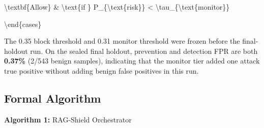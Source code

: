 \documentclass[conference]{IEEEtran}
\begin{document}
\textbackslash{}textbf\{Allow\} \& \textbackslash{}text\{if \} P\_\{\textbackslash{}text\{risk\}\} < \textbackslash{}tau\_\{\textbackslash{}text\{monitor\}\}

\textbackslash{}end\{cases\}$$


The 0.35 block threshold and 0.31 monitor threshold were frozen before the final-holdout run. On the sealed final holdout, prevention and detection FPR are both \textbf{0.37\%} (2/543 benign samples), indicating that the monitor tier added one attack true positive without adding benign false positives in this run.


\subsection{Formal Algorithm}

\textbf{Algorithm 1:} RAG-Shield Orchestrator
\end{document}
